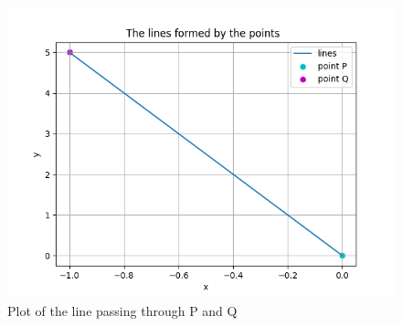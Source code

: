 \documentclass[journal]{IEEEtran}
\begin{document}
\begin{figure}[h!]
   \centering
   \includegraphics[width=0.7\linewidth]{figs/fig.png}
   \caption{Plot of the line passing through  P and Q}
   \label{stemplot}
\end{figure}
\end{document}

